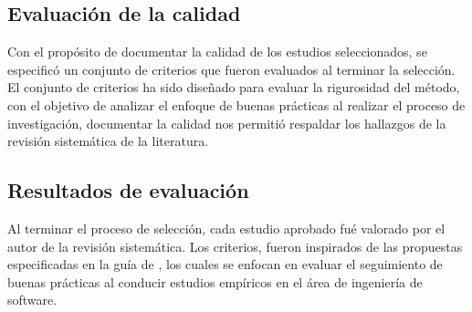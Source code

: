 \documentclass[conference,onecolumn,10pt]{IEEEtran}
\begin{document}
\subsection{Evaluación de la calidad}

Con el propósito de documentar la calidad de los estudios seleccionados, 
se especificó un conjunto de criterios que fueron evaluados al terminar la 
selección.
El conjunto de criterios ha sido diseñado para evaluar la rigurosidad del método, 
con el objetivo de analizar el enfoque de buenas prácticas al realizar el proceso de 
investigación, documentar la calidad nos permitió respaldar los hallazgos de la 
revisión sistemática de la literatura. 


\begin{table}[ht]
        \caption{Criterios para evaluar} 
        \centering 
        \label{table:tablaterminos}
\end{table}


\subsection{Resultados de evaluación}
\label{sub:reseval}
Al terminar el proceso de selección, cada estudio aprobado fué valorado por el autor de la revisión sistemática.
Los criterios, fueron inspirados de las propuestas especificadas en la guía de \cite{kitchenham2007guidelines}, 
los cuales se enfocan en evaluar el seguimiento de buenas prácticas al conducir estudios empíricos en el área 
de ingeniería de software.
\end{document}

